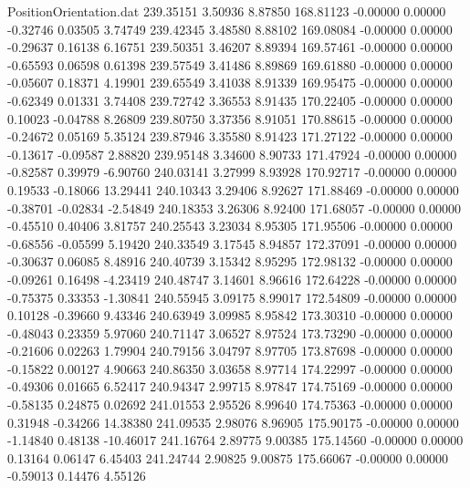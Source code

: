 \begin{filecontents}{PositionOrientation.dat}
 239.35151    3.50936    8.87850   168.81123   -0.00000    0.00000   -0.32746    0.03505    3.74749
 239.42345    3.48580    8.88102   169.08084   -0.00000    0.00000   -0.29637    0.16138    6.16751
 239.50351    3.46207    8.89394   169.57461   -0.00000    0.00000   -0.65593    0.06598    0.61398
 239.57549    3.41486    8.89869   169.61880   -0.00000    0.00000   -0.05607    0.18371    4.19901
 239.65549    3.41038    8.91339   169.95475   -0.00000    0.00000   -0.62349    0.01331    3.74408
 239.72742    3.36553    8.91435   170.22405   -0.00000    0.00000    0.10023   -0.04788    8.26809
 239.80750    3.37356    8.91051   170.88615   -0.00000    0.00000   -0.24672    0.05169    5.35124
 239.87946    3.35580    8.91423   171.27122   -0.00000    0.00000   -0.13617   -0.09587    2.88820
 239.95148    3.34600    8.90733   171.47924   -0.00000    0.00000   -0.82587    0.39979   -6.90760
 240.03141    3.27999    8.93928   170.92717   -0.00000    0.00000    0.19533   -0.18066   13.29441
 240.10343    3.29406    8.92627   171.88469   -0.00000    0.00000   -0.38701   -0.02834   -2.54849
 240.18353    3.26306    8.92400   171.68057   -0.00000    0.00000   -0.45510    0.40406    3.81757
 240.25543    3.23034    8.95305   171.95506   -0.00000    0.00000   -0.68556   -0.05599    5.19420
 240.33549    3.17545    8.94857   172.37091   -0.00000    0.00000   -0.30637    0.06085    8.48916
 240.40739    3.15342    8.95295   172.98132   -0.00000    0.00000   -0.09261    0.16498   -4.23419
 240.48747    3.14601    8.96616   172.64228   -0.00000    0.00000   -0.75375    0.33353   -1.30841
 240.55945    3.09175    8.99017   172.54809   -0.00000    0.00000    0.10128   -0.39660    9.43346
 240.63949    3.09985    8.95842   173.30310   -0.00000    0.00000   -0.48043    0.23359    5.97060
 240.71147    3.06527    8.97524   173.73290   -0.00000    0.00000   -0.21606    0.02263    1.79904
 240.79156    3.04797    8.97705   173.87698   -0.00000    0.00000   -0.15822    0.00127    4.90663
 240.86350    3.03658    8.97714   174.22997   -0.00000    0.00000   -0.49306    0.01665    6.52417
 240.94347    2.99715    8.97847   174.75169   -0.00000    0.00000   -0.58135    0.24875    0.02692
 241.01553    2.95526    8.99640   174.75363   -0.00000    0.00000    0.31948   -0.34266   14.38380
 241.09535    2.98076    8.96905   175.90175   -0.00000    0.00000   -1.14840    0.48138  -10.46017
 241.16764    2.89775    9.00385   175.14560   -0.00000    0.00000    0.13164    0.06147    6.45403
 241.24744    2.90825    9.00875   175.66067   -0.00000    0.00000   -0.59013    0.14476    4.55126

\end{filecontents}
